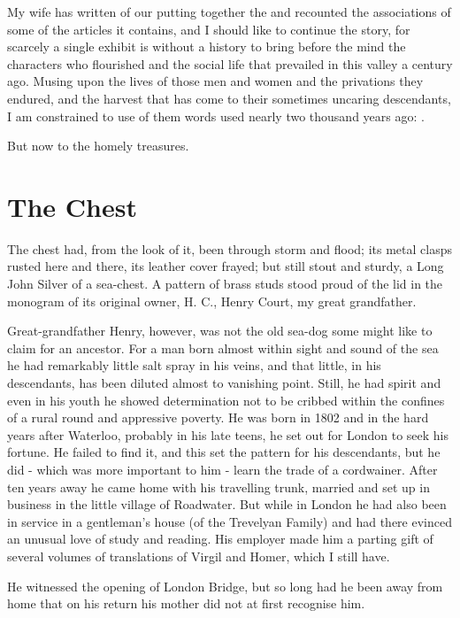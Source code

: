 
My wife has written of our putting together the  and recounted the associations of some of the articles it contains, and I should like to continue the story, for scarcely a single exhibit is without a history to bring before the mind the characters who flourished and the social life that prevailed in this valley a century ago. Musing upon the lives of those men and women and the privations they endured, and the harvest that has come to their sometimes uncaring descendants, I am constrained to use of them words used nearly two thousand years ago: .

But now to the homely treasures.
 
\section{The Chest} 
 
The chest had, from the look of it, been through storm and flood; its metal clasps rusted here and there, its leather cover frayed; but still stout and sturdy, a Long John Silver of a sea-chest. A pattern of brass studs stood proud of the lid in the monogram of its original owner, H. C., Henry Court, my great grandfather.

Great-grandfather Henry, however, was not the old sea-dog some might like to claim for an ancestor. For a man born almost within sight and sound of the sea he had remarkably little salt spray in his veins, and that little, in his descendants, has been diluted almost to vanishing point. Still, he had spirit and even in his youth he showed determination not to be cribbed within the confines of a rural round and appressive poverty. He was born in 1802 and in the hard years after Waterloo, probably in his late teens, he set out for London to seek his fortune. He failed to find it, and this set the pattern for his descendants, but he did - which was more important to him - learn the trade of a cordwainer. After ten years away he came home with his travelling trunk, married and set up in business in the little village of Roadwater. But while in London he had also been in service in a gentleman's house (of the Trevelyan Family) and had there evinced an unusual love of study and reading. His employer made him a parting gift of several volumes of translations of Virgil and Homer, which I still have.

He witnessed the opening of London Bridge, but so long had he been away from home that on his return his mother did not at first recognise him.

